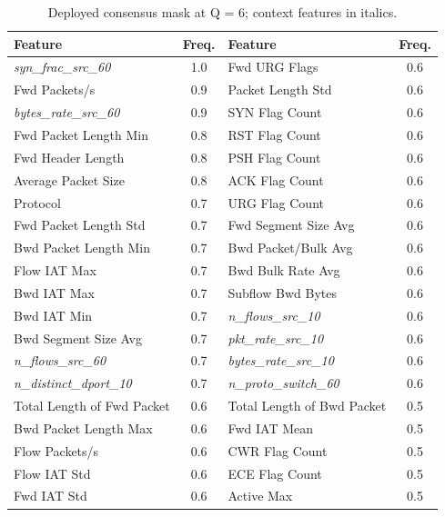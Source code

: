 \documentclass[conference]{IEEEtran}
\begin{document}
\begin{table}[!t]
\centering
\scriptsize
\caption{Deployed consensus mask at Q = 6; context features in italics.}
\label{tab:selected_features}
\setlength{\tabcolsep}{2.5pt}
\renewcommand{\arraystretch}{1.02}
\begin{tabular}{>{\raggedright\arraybackslash}p{3.0cm}c >{\raggedright\arraybackslash}p{3.0cm}c}
\hline\toprule
Feature & Freq. & Feature & Freq. \\
\hline\toprule
\textit{syn\_frac\_src\_60} & 1.0 & Fwd URG Flags & 0.6 \\
Fwd Packets/\allowbreak s & 0.9 & Packet Length Std & 0.6 \\
\textit{bytes\_rate\_src\_60} & 0.9 & SYN Flag Count & 0.6 \\
Fwd Packet Length Min & 0.8 & RST Flag Count & 0.6 \\
Fwd Header Length & 0.8 & PSH Flag Count & 0.6 \\
Average Packet Size & 0.8 & ACK Flag Count & 0.6 \\
Protocol & 0.7 & URG Flag Count & 0.6 \\
Fwd Packet Length Std & 0.7 & Fwd Segment Size Avg & 0.6 \\
Bwd Packet Length Min & 0.7 & Bwd Packet/\allowbreak Bulk Avg & 0.6 \\
Flow IAT Max & 0.7 & Bwd Bulk Rate Avg & 0.6 \\
Bwd IAT Max & 0.7 & Subflow Bwd Bytes & 0.6 \\
Bwd IAT Min & 0.7 & \textit{n\_flows\_src\_10} & 0.6 \\
Bwd Segment Size Avg & 0.7 & \textit{pkt\_rate\_src\_10} & 0.6 \\
\textit{n\_flows\_src\_60} & 0.7 & \textit{bytes\_rate\_src\_10} & 0.6 \\
\textit{n\_distinct\_dport\_10} & 0.7 & \textit{n\_proto\_switch\_60} & 0.6 \\
Total Length of Fwd Packet & 0.6 & Total Length of Bwd Packet & 0.5 \\
Bwd Packet Length Max & 0.6 & Fwd IAT Mean & 0.5 \\
Flow Packets/\allowbreak s & 0.6 & CWR Flag Count & 0.5 \\
Flow IAT Std & 0.6 & ECE Flag Count & 0.5 \\
Fwd IAT Std & 0.6 & Active Max & 0.5 \\
\hline\toprule
\end{tabular}
\end{table}
\end{document}
